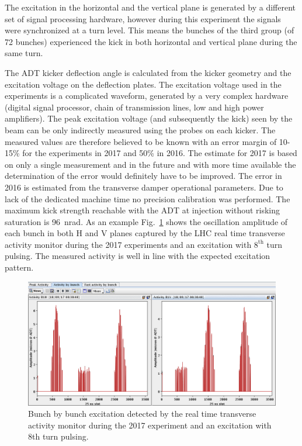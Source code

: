 \documentclass[%
 reprint,
 amsmath,amssymb,
 aps,
prstab,
]{revtex4-1}
\begin{document}
The excitation in the horizontal and the vertical plane is generated by a different set of signal processing hardware, however during this experiment the signals were synchronized at a turn level. This means the bunches of the third group (of 72 bunches) experienced the kick in both horizontal and vertical plane during the same turn.

The ADT kicker deflection angle is calculated from the kicker geometry and the excitation voltage on the deflection plates. The excitation voltage used in the experiments is a complicated waveform, generated by a very complex hardware (digital signal processor, chain of transmission lines, low and high power amplifiers). The peak excitation voltage (and subsequently the kick) seen by the beam can be only indirectly measured using the probes on each kicker. The measured values are therefore believed to be known with an error margin of 10-15\% for the experiments in 2017 and 50\% in 2016. The estimate for 2017 is based on only a single measurement and in the future and with more time available the determination of the error would definitely have to be improved. The error in 2016 is estimated from the transverse damper operational parameters. Due to lack of the dedicated machine time no precision calibration was performed. The maximum kick strength reachable with the ADT at injection without risking saturation is 96~nrad. As an example Fig.~\ref{fig:fill_meas} shows the oscillation amplitude of each bunch in both H and V planes captured by the LHC real time transverse activity monitor during the 2017 experiments and an excitation with $8^{\mathrm{th}}$ turn pulsing. The measured activity is well in line with the expected excitation pattern.
\begin{figure}[h]
	\centering
	\includegraphics[width=1.0\linewidth]{bunchfilling_measured.png}	
	\caption{\label{fig:fill_meas} Bunch by bunch excitation detected by the real time transverse activity monitor during the 2017 experiment and an excitation with 8th turn pulsing.}
\end{figure}
\end{document}
